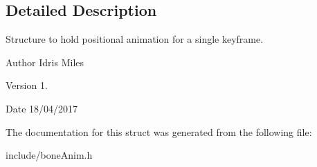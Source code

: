 \subsection{Detailed Description}
Structure to hold positional animation for a single keyframe. 

\begin{DoxyAuthor}{Author}
Idris Miles 
\end{DoxyAuthor}
\begin{DoxyVersion}{Version}
1. 
\end{DoxyVersion}
\begin{DoxyDate}{Date}
18/04/2017 
\end{DoxyDate}


The documentation for this struct was generated from the following file\+:\begin{DoxyCompactItemize}
\item 
include/bone\+Anim.\+h\end{DoxyCompactItemize}
